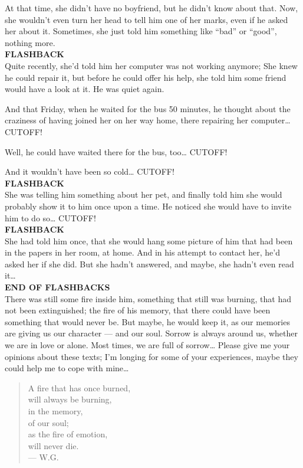At that time, she didn't have no boyfriend, but he didn't know about that. 
Now, she wouldn't even turn her head to tell him one of her marks, even if he asked her about it. 
Sometimes, she just told him something like \enquote{bad} or \enquote{good}, nothing more. \\
\textbf{FLASHBACK}\\
Quite recently, she'd told him her computer was not working anymore; She knew he could repair it, but before he could offer his help, she told him some friend would have a look at it. 
He was quiet again.

And that Friday, when he waited for the bus 50 minutes, he thought about the craziness of having joined her on her way home, there repairing her computer\ldots
CUTOFF!

Well, he could have waited there for the bus, too\ldots
CUTOFF!

And it wouldn't have been so cold\ldots
CUTOFF!\\
\textbf{FLASHBACK}\\
She was telling him something about her pet, and finally told him she would probably show it to him once upon a time. 
He noticed she would have to invite him to do so\ldots
CUTOFF!\\
\textbf{FLASHBACK}\\
She had told him once, that she would hang some picture of him that had been in the papers in her room, at home. 
And in his attempt to contact her, he'd asked her if she did. 
But she hadn't answered, and maybe, she hadn't even read it\ldots\\
\textbf{END OF FLASHBACKS}\\
There was still some fire inside him, something that still was burning, that had not been extinguished; the fire of his memory, that there could have been something that would never be. 
But maybe, he would keep it, as our memories are giving us our character --- and our soul. 
Sorrow is always around us, whether we are in love or alone. 
Most times, we are full of sorrow\ldots
Please give me your opinions about these texts; I'm longing for some of your experiences, maybe they could help me to cope with mine\ldots

\begin{verse}
A fire that has once burned, \\
will always be burning, \\
in the memory, \\
of our soul; \\
as the fire of emotion, \\
will never die. \\
--- W.G.
\end{verse}

